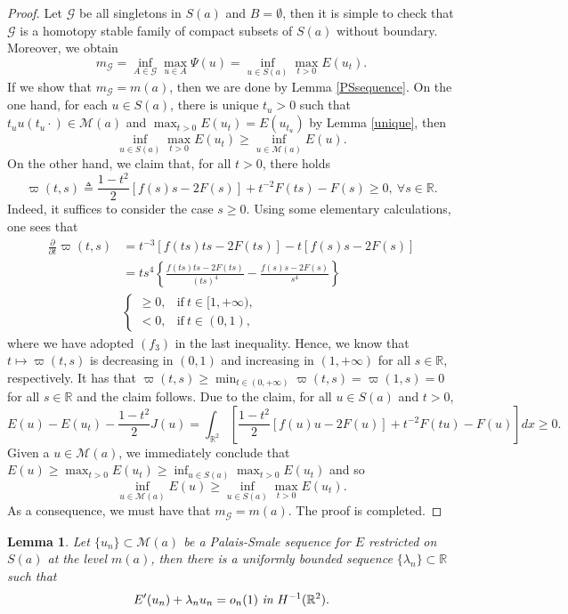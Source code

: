 \documentclass[11pt]{amsart}
\numberwithin{equation}{section}
\newtheorem{lemma}[theorem]{Lemma}
\theoremstyle{definition}
\newcommand{\R}{\mathbb{R}}
\begin{document}
\begin{proof}
Let $\mathcal{G}$ be all singletons in $S(a)$ and $B=\emptyset$, then it is simple to check that $\mathcal{G}$ is a homotopy stable
family of compact subsets of $S(a)$
without boundary. Moreover, we obtain
\[
m_{\mathcal{G}}=\inf_{A\in \mathcal{G}}\max_{u\in A}\Psi(u)=\inf_{u\in S(a)}\max_{t>0}E(u_t).
\]
If we show that $m_{\mathcal{G}}=m(a)$, then we are done by Lemma \ref{PSsequence}.
On the one hand, for each $u\in S(a)$, there is unique $t_u>0$ such that $t_uu(t_u\cdot)\in \mathcal{M}(a)$
and $\max_{t>0}E(u_t)=E(u_{t_u})$ by Lemma \ref{unique}, then
\[
\inf_{u\in S(a)}\max_{t>0}E(u_t)\geq\inf_{u\in \mathcal{M}(a)} E(u).
\]
On the other hand,
we claim that, for all $t>0$, there holds
\[
\varpi(t,s)\triangleq\frac{1-t^2}2[f(s)s-2F(s)]+t^{-2}F(ts)-F(s)\geq0,~\forall s\in\R.
\]
Indeed, it suffices to consider the case $s\geq0$. Using some elementary calculations, one sees that
\begin{align*}
 \frac{\partial}{\partial t}\varpi(t,s) &= t^{-3}[f(ts)ts-2F(ts)]-t[f(s)s-2F(s)]\\
   & =ts^4\left\{  \frac{ f(ts)ts-2F(ts) }{(ts)^4}-\frac{ f(s)s-2F(s) }{s^4}  \right\}\\
&
\left\{
  \begin{array}{ll}
   \geq0, &\text{if}~t\in[1,+\infty), \\
    <0, & \text{if}~t\in(0,1),
  \end{array}
\right.
\end{align*}
where we have adopted $(f_3)$ in the last inequality. Hence, we know that $t\mapsto \varpi(t,s)$
is decreasing in $(0,1)$ and increasing in $(1,+\infty)$ for all $s\in\R$, respectively.
It has that $\varpi(t,s)\geq\min_{t\in(0,+\infty)}\varpi(t,s)=\varpi(1,s)=0$ for all $s\in\R$ and the claim follows.
Due to the claim, for all $u\in S(a)$ and $t>0$,
\[
E(u)-E(u_t)-\frac{1-t^2}{2}J(u)=\int_{\R^2}\left[\frac{1-t^2}2[f(u)u-2F(u)]+t^{-2}F(tu)-F(u)\right]dx\geq0.
\]
Given a $u\in \mathcal{M}(a)$, we immediately conclude that $E(u)\geq \max_{t>0}E(u_t)\geq \inf_{u\in S(a)}\max_{t>0}E(u_t)$
and so
\[
\inf_{u\in \mathcal{M}(a)} E(u)\geq \inf_{u\in S(a)}\max_{t>0}E(u_t).
\]
As a consequence, we must have that $m_{\mathcal{G}}=m(a)$. The proof is completed.
\end{proof}

\begin{lemma}\label{2bounded}
Let $\{u_n\}\subset \mathcal{M}(a)$ be a Palais-Smale sequence for $E$ restricted on $S(a)$
at the level $m(a)$, then there is a uniformly bounded sequence $\{\lambda_n\}\subset \R$ such that
\begin{equation}\label{2bounded1}
   E^\prime(u_n)+\lambda_nu_n=o_n(1)~\emph{\text{in}}~H^{-1}(\R^2).
\end{equation}
\end{lemma}
\end{document}
